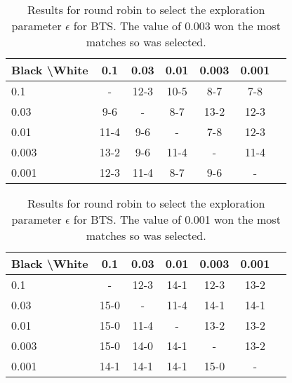 \documentclass{article}
\theoremstyle{plain}
\begin{document}
\begin{appendices}
            \begin{table*}[]
            \centering
                \begin{tabular}{l|cccccc}
                    \textbf{Black \textbackslash White}     & 0.1  & 0.03   & 0.01   & 0.003    & 0.001    \\ 
                    \hline
                                            0.1            & - & 12-3 & 10-5 & 8-7 & 7-8   		\\
                                            0.03            & 9-6 & - & 8-7 & 13-2 & 12-3   		\\
                                            0.01          & 11-4 & 9-6 & - & 7-8 & 12-3   		\\
                                            0.003          & 13-2 & 9-6 & 11-4 & - & 11-4   		\\
                                            0.001         & 12-3 & 11-4 & 8-7 & 9-6 &   -   	\\    
                \end{tabular}
                \caption{Results for round robin to select the exploration parameter $\epsilon$ for BTS. The value of 0.003 won the most matches so was selected. \label{tab:w030}}
            \end{table*}
            
            \begin{table*}[]
            \centering
                \begin{tabular}{l|cccccc}
                    \textbf{Black \textbackslash White}     & 0.1  & 0.03   & 0.01   & 0.003    & 0.001    \\ 
                    \hline
                                            0.1            & - & 12-3 & 14-1 & 12-3 & 13-2   		\\
                                            0.03            & 15-0 & - & 11-4 & 14-1 & 14-1   		\\
                                            0.01          & 15-0 & 11-4 & - & 13-2 & 13-2   		\\
                                            0.003          & 15-0 & 14-0 & 14-1 & - & 13-2   		\\
                                            0.001         & 14-1 & 14-1 & 14-1 & 15-0 &   -   	\\    
                \end{tabular}
                \caption{Results for round robin to select the exploration parameter $\epsilon$ for BTS. The value of 0.001 won the most matches so was selected. \label{tab:x030}}
            \end{table*}
            

\end{appendices}
\end{document}
